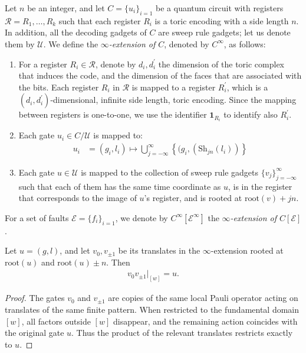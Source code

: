\begin{definition}
  \label{def:extension}
  Let $n$ be an integer, and let $C = \{u_{i}\}_{i=1}$ be a quantum circuit with registers $\mathcal{R} = R_{1}, \ldots, R_{k}$ such that each register $R_{i}$ is a toric encoding with a side length $n$. In addition, all the decoding gadgets of $C$ are sweep rule gadgets; let us denote them by $\mathcal{U}$. We define the \textit{$\infty$-extension of $C$}, denoted by $C^{\infty}$, as follows:
  \begin{enumerate}
    \item For a register $R_{i} \in \mathcal{R}$, denote by $d_{i}, d_{i}^{\prime}$ the dimension of the toric complex that induces the code, and the dimension of the faces that are associated with the bits. Each register $R_{i}$ in $\mathcal{R}$ is mapped to a register $R^{\prime}_{i}$, which is a $(d_{i}, d_{i}^\prime)$-dimensional, infinite side length, toric encoding. Since the mapping between registers is one-to-one, we use the identifier $\mathbf{1}_{R_{i}}$ to identify also $R^{\prime}_{i}$.
    \item Each gate $u_{i} \in C / \mathcal{U}$ is mapped to:     
      \begin{equation*}
        \begin{split}
          u_{i} & = (g_{i},l_{i}) \mapsto  
          \bigcup_{j = -\infty}^{\infty}\left\{ (g_{i},( \text{Sh}_{jn}(l_{i})) \right\}
        \end{split}
      \end{equation*}
    \item Each gate $ u \in \mathcal{U} $ is mapped to the collection of sweep rule gadgets $\{ v_{j} \}_{j = -\infty}^{\infty}$ such that each of them has the same time coordinate as $ u $, is in the register that corresponds to the image of $ u $'s register, and is rooted at $\text{root}(v) + j n$.
  \end{enumerate}
  For a set of faults $\mathcal{E} = \{ f_{i} \}_{i=1}$, we denote by $C^{\infty}[\mathcal{E}^{\infty}]$ the \textit{$\infty$-extension of $C[\mathcal{E}]$}.
\end{definition}


\begin{claim}
\label{claim:pauli_back}
  Let $u=(g,l)$, and let $v_{0},v_{\pm 1}$ be its translates in the $\infty$-extension rooted at $\mathrm{root}(u)$ and $\mathrm{root}(u)\pm n$. Then
  \begin{equation*}
    \begin{split}
      v_{0}v_{\pm 1}|_{[w]} = u.
    \end{split}
  \end{equation*}
\end{claim}
\begin{proof}
  The gates $v_{0}$ and $v_{\pm 1}$ are copies of the same local Pauli operator acting on translates of the same finite pattern. When restricted to the fundamental domain $[w]$, all factors outside $[w]$ disappear, and the remaining action coincides with the original gate $u$. Thus the product of the relevant translates restricts exactly to $u$.
\end{proof}

